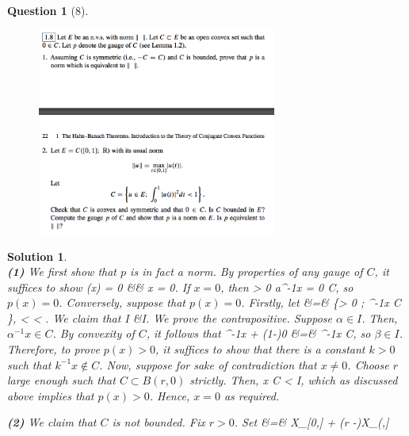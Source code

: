 \documentclass{article} %
\def\eQb#1\eQe{\begin{eqnarray*}#1\end{eqnarray*}}
\theoremstyle{quest}
\newtheorem*{question}{Question}
\newtheorem*{solution}{Solution}
\begin{document}
\newpage

\begin{question}[8]
\hfill
\begin{figure}[h!]
  \centering
    \includegraphics[width=0.7\textwidth]{funcA-1-8.png}
\end{figure}
\end{question}
\begin{solution} \hfill \\
\textbf{(1)}
We first show that $p$ is in fact a norm. By properties of any gauge of $C$,
it suffices to show 
\eQb
p(x) = 0 \>\> &\iff& \>\> x = 0. 
\eQe
If $x = 0$, then 
\eQb
\alpha > 0 \implies a^{-1}x = 0 \in C, 
\eQe
so $p(x) = 0$. Conversely, suppose that $p(x) = 0$. Firstly, let 
\eQb
I &=& \{\lambda > 0 \>;\> \lambda^{-1}x \in C \}, \>   < \alpha < \beta. 
\eQe
We claim that 
\eQb
\beta \not\in I &\implies \alpha \not\in I.
\eQe
We prove the contrapositive. Suppose $\alpha \in I$. Then, $\alpha^{-1}x \in C$.
By convexity of $C$, it follows that
\eQb
\dfrac{\beta^{-1}}{\alpha^{-1}}\alpha^{-1}x + (1-)0
&=& \beta^{-1}x \in C,
\eQe
so $\beta \in I$. Therefore, to prove $p(x) > 0$, it suffices to show that
there is a constant $k > 0 $ such that $k^{-1}x \not\in C$.  
Now, suppose for sake of contradiction that $x \neq 0$. 
 Choose $r$ large enough
such that $C \subset B(r,0)$ strictly. Then, 
\eQb
\dfrac{r}{||x||}x \in C \>\>  \> <  \in I,
\eQe
which as discussed above implies that $p(x) > 0$. Hence, $x = 0$ as required. 

\bigskip

\textbf{(2)} We claim that $C$ is not bounded. Fix $r > 0$. Set 
\eQb
f &=&  X_{[0,]} + (r -)X_{(,]} 
\eQe

\end{solution}
\end{document}
